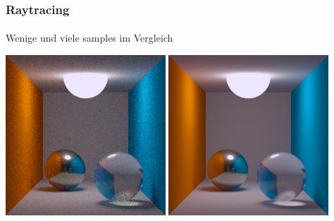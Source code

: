 \documentclass{beamer}
\begin{document}
\begin{frame}
    \frametitle{Raytracing}
\framesubtitle{}
Wenige und viele samples im Vergleich

    \includegraphics[width=0.45\textwidth]{images/Path_Tracing_Low}
    \includegraphics[width=0.45\textwidth]{images/Path_Tracing_High}

\end{frame}
\end{document}
